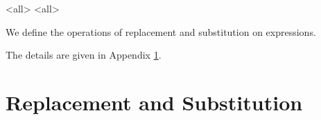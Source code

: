 
\mode<all>{}
\mode<all>{}

We define the operations of replacement and substitution on
expressions.  




The details are given in Appendix \ref{appendix:repsub}.




%
%
%

\section{Replacement and Substitution}
\label{appendix:repsub}













